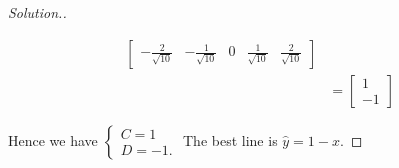 \begin{enumerate}
\begin{proof}[Solution.]
\begin{itemize}
\begin{align*}
\begin{bmatrix}
-\frac{2}{\sqrt{10}}&-\frac{1}{\sqrt{10}}&0&\frac{1}{\sqrt{10}}&\frac{2}{\sqrt{10}}
\end{bmatrix}\\
&=\begin{bmatrix}
1\\-1
\end{bmatrix}
\end{align*}
\end{itemize}
Hence we have $\begin{cases}
C=1\\D=-1.
\end{cases}$ The best line is $\hat y=1-x$.
\end{proof}
\end{enumerate}